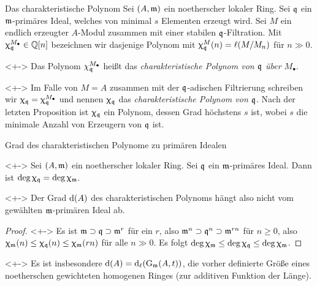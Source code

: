 \begin{frame}{Das charakteristische Polynom}
	Sei \((A, \mathfrak{m})\) ein noetherscher lokaler Ring. Sei \(\mathfrak{q}\) ein \(\mathfrak{m}\)-primäres Ideal, welches von
	minimal \(s\) Elementen erzeugt wird.
	Sei \(M\) ein endlich erzeugter \(A\)-Modul zusammen mit einer stabilen \(\mathfrak{q}\)-Filtration.
	Mit \(\upchi_{\mathfrak{q}}^{M_\bullet} \in \mathbb Q[n]\) bezeichnen wir dasjenige Polynom
	mit \(\upchi_{\mathfrak{q}}^M(n) = \ell(M/M_n)\) für
	\(n \gg 0\).
	\begin{definition}<+->
		Das Polynom \(\chi_{\mathfrak{q}}^{M_\bullet}\) heißt das \emph{charakteristische Polynom von \(\mathfrak{q}\) über \(M_\bullet\)}.
	\end{definition}
	\begin{example}<+->
		Im Falle von \(M = A\) zusammen mit der \(\mathfrak{q}\)-adischen Filtrierung schreiben
		wir \(\upchi_{\mathfrak{q}} = \upchi_{\mathfrak{q}}^{M_\bullet}\) und nennen \(\upchi_{\mathfrak{q}}\) das
		\emph{charakteristische Polynom von \(\mathfrak{q}\)}. Nach der letzten Proposition ist \(\upchi_{\mathfrak{q}}\) ein Polynom, dessen
		Grad höchstens \(s\) ist, wobei \(s\) die minimale Anzahl von Erzeugern von \(\mathfrak{q}\) ist.
	\end{example}
\end{frame}

\begin{frame}{Grad des charakteristischen Polynome zu primären Idealen}
	\begin{proposition}<+->
		Sei \((A, \mathfrak{m})\) ein noetherscher lokaler Ring. Sei \(\mathfrak{q}\) ein \(\mathfrak{m}\)-primäres Ideal. Dann ist
		\(\deg \upchi_{\mathfrak{q}} = \deg \upchi_{\mathfrak{m}}\).
	\end{proposition}
	\begin{visibleenv}<+->
		Der Grad \(\operatorname{d}(A)\) des charakteristischen Polynoms hängt also nicht vom gewählten \(\mathfrak{m}\)-primären Ideal ab. 
	\end{visibleenv}
	\begin{proof}<+->
		Es ist \(\mathfrak{m} \supset \mathfrak{q} \supset \mathfrak{m}^r\) für ein \(r\), also \(\mathfrak{m}^n \supset \mathfrak{q}^n
		\supset \mathfrak{m}^{rn}\)
		für \(n \ge 0\), also \(\upchi_{\mathfrak{m}}(n) \le \upchi_{\mathfrak{q}}(n) \le \upchi_{\mathfrak{m}}(rn)\) für alle \(n \gg 0\).
		Es folgt \(\deg \upchi_{\mathfrak{m}} \le \deg \upchi_{\mathfrak{q}} \le \deg\upchi_{\mathfrak{m}}\).
	\end{proof}
	\begin{remark}<+->
		Es ist insbesondere \(\operatorname{d}(A) = \operatorname{d}_\ell(\operatorname{G}_{\mathfrak{m}}(A, t))\), die vorher definierte Größe eines noetherschen
		gewichteten homogenen Ringes (zur additiven Funktion der Länge).
	\end{remark}
\end{frame}

